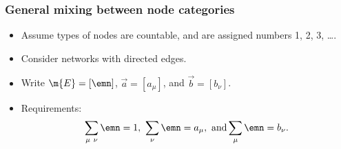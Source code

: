 \begin{frame}
  \frametitle{General mixing between node categories}

  \begin{itemize}
  \item<2->
    Assume types of nodes are countable, and are
    assigned numbers 1, 2, 3, \ldots.
  \item<3->
    Consider networks with directed edges.
  \item<7->
    Write $\m{E} = [\emn]$, $\vec{a} = [a_\mu]$, and $\vec{b} = [b_\nu]$.
  \item<8->
    Requirements:
    $$
    \sum_{\mu\ \nu} \emn = 1,
    \
    \sum_{\nu} \emn = a_{\mu},
    \
    \mbox{and}
    \sum_{\mu} \emn = b_{\nu}.
    $$
  \end{itemize}

\end{frame}


